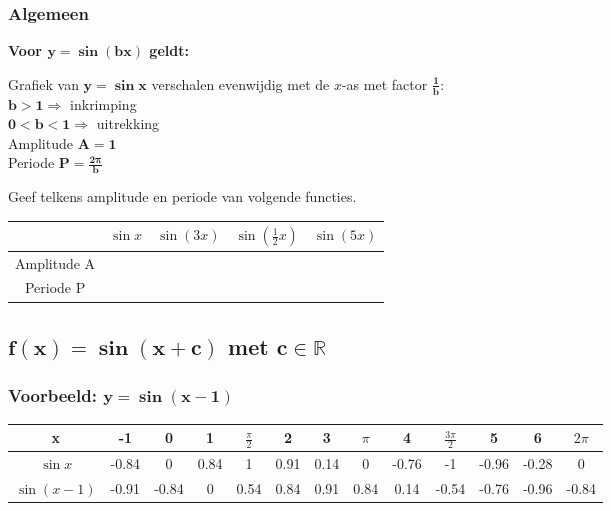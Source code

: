 \documentclass[a4paper,12pt]{article}
\begin{document}
\subsubsection{Algemeen}
{\bfseries
Voor $\boldsymbol{y=\sin (bx)}$ geldt:
  \begin{center}
    Grafiek van $\boldsymbol{y=\sin x}$ verschalen evenwijdig met de $x$-as met factor $\boldsymbol{\frac{1}{b}}$:\\
    $\boldsymbol{b>1 \Rightarrow}$ inkrimping\\
    $\boldsymbol{0<b<1 \Rightarrow}$ uitrekking \\
    Amplitude $\boldsymbol{A = 1}$\\
    Periode $\boldsymbol{P = \frac{2\pi}{b}}$
  \end{center}
  }

\begin{oefening}
Geef telkens amplitude en periode van volgende functies.
\begin{center}
  \begin{tabular}{c|c|c|c|c}
     & $\sin x$ & $\sin (3x)$ &$\sin (\frac{1}{2}x)$ & $\sin (5x)$\\
    \hline
    Amplitude A &\hspace*{2cm} &\hspace*{2cm}&\hspace*{2cm}&\hspace*{2cm}
    \\
    \hline
    Periode P &\hspace*{2cm}&\hspace*{2cm}&\hspace*{2cm}&\hspace*{2cm}
  \end{tabular}
\end{center}
\end{oefening}

\subsection{$\boldsymbol{f(x)=\sin (x+c)}$ met $\boldsymbol{c\in \mathbb{R}}$}
\subsubsection{Voorbeeld: $\boldsymbol{y=\sin (x-1)}$}

\begin{adjustwidth}{-2.5cm}{-2.5cm}
\begin{center}
\scriptsize
  \begin{tabular}{c|c|c|c|c|c|c|c|c|c|c|c|c}
    x & -1 & 0 & 1 &  $\frac{\pi}{2}$ & 2 & 3 & $\pi$ & 4 & $\frac{3\pi}{2}$ & 5 & 6 & $2\pi$
    \\
    \hline
   $\sin x$ &-0.84&0&0.84&1&0.91&0.14&0&-0.76&-1&-0.96&-0.28 &0
    \\
    \hline
   $\sin (x-1)$ &-0.91 &-0.84 &0 &0.54 &0.84 &0.91 &0.84 &0.14 &-0.54 &-0.76 &-0.96 &-0.84
  \end{tabular}
\end{center}
\end{adjustwidth}
\end{document}
